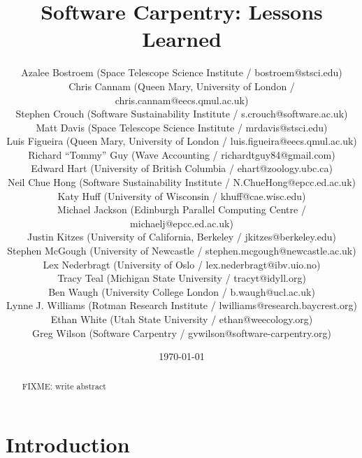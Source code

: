 \documentclass{article}
\begin{document}
\title{Software Carpentry: Lessons Learned}
\date{\today}

\author{
  Azalee Bostroem (Space Telescope Science Institute / bostroem@stsci.edu)\\
  Chris Cannam (Queen Mary, University of London / chris.cannam@eecs.qmul.ac.uk)\\
  Stephen Crouch (Software Sustainability Institute / s.crouch@software.ac.uk)\\
  Matt Davis (Space Telescope Science Institute / mrdavis@stsci.edu)\\
  Luis Figueira (Queen Mary, University of London / luis.figueira@eecs.qmul.ac.uk)\\
  Richard ``Tommy'' Guy (Wave Accounting / richardtguy84@gmail.com)\\
  Edward Hart (University of British Columbia / ehart@zoology.ubc.ca)\\
  Neil Chue Hong (Software Sustainability Institute / N.ChueHong@epcc.ed.ac.uk)\\
  Katy Huff (University of  Wisconsin / khuff@cae.wisc.edu)\\
  Michael Jackson (Edinburgh Parallel Computing Centre / michaelj@epcc.ed.ac.uk)\\
  Justin Kitzes (University of California, Berkeley / jkitzes@berkeley.edu)\\
  Stephen McGough (University of Newcastle / stephen.mcgough@newcastle.ac.uk) \\
  Lex Nederbragt (University of Oslo / lex.nederbragt@ibv.uio.no)\\
  Tracy Teal (Michigan State University / tracyt@idyll.org)\\
  Ben Waugh (University College London / b.waugh@ucl.ac.uk)\\
  Lynne J. Williams (Rotman Research Institute / lwilliams@research.baycrest.org)\\
  Ethan White (Utah State University / ethan@weecology.org)\\
  Greg Wilson (Software Carpentry / gvwilson@software-carpentry.org)
}

\maketitle

\begin{abstract}
FIXME: write abstract
\end{abstract}

\section{Introduction}
\end{document}

